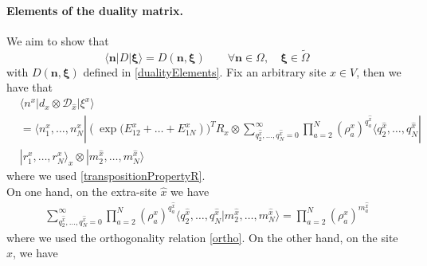 \documentclass[11pt]{article}
\numberwithin{equation}{section}
\numberwithin{equation}{subsection}
\newcommand{\dd}{\mathcal{D}_{\widehat{x}}}
\begin{document}
\paragraph{Elements of the duality matrix.}We aim to show that 
\begin{equation}\label{proofDualityElements}
\langle \bm{n}|D|\bm{\xi}\rangle=D(\bm{n},\bm{\xi})\qquad   \forall \bm{n}\in \Omega,\quad \bm{\xi}\in \widetilde{\Omega}
\end{equation}
with $D(\bm{n},\bm{\xi})$ defined in \eqref{dualityElements}. 
Fix an arbitrary site $x\in V$, then we have that 
\begin{align*}
	 &\langle n^{x}|d_{x}\otimes \dd|\xi^{x}\rangle\\&=\langle n_{1}^{x},\ldots,n_{N}^{x}| (\exp{(E_{12}^{x}+\ldots+E_{1N}^{x}}))^{T}R_{x}\otimes\sum_{q_{2}^{\widehat{x}},\ldots,q_{N}^{\widehat{x}}=0}^{\infty}\prod_{a=2}^{N}\left(\rho_{a}^{x}\right)^{q_{a}^{\widehat{x}}}\langle q_{2}^{\widehat{x}},\ldots,q_{N}^{\widehat{x}}|
	 \\&|r_{1}^{x},\ldots,r_{N}^{x}\rangle_{x} \otimes |m_{2}^{\widehat{x}},\ldots,m_{N}^{\widehat{x}}\rangle
\end{align*}
where we used \eqref{transpositionPropertyR}. \\
On one hand, on the extra-site $\widehat{x}$ we have 
\begin{align*}
\sum_{q_{2}^{\widehat{x}},\ldots,q_{N}^{\widehat{x}}=0}^{\infty}\prod_{a=2}^{N}\left(\rho_{a}^{x}\right)^{q_{a}^{\widehat{x}}}\langle q_{2}^{\widehat{x}},\ldots,q_{N}^{\widehat{x}}|m_{2}^{\widehat{x}},\ldots,m_{N}^{\widehat{x}}\rangle=\prod_{a=2}^{N}\left(\rho_{a}^{x}\right)^{m_{a}^{\widehat{x}}}
\end{align*}
where we used the orthogonality relation \eqref{ortho}. 
On the other hand, on the site $x$, we have 
\end{document}
